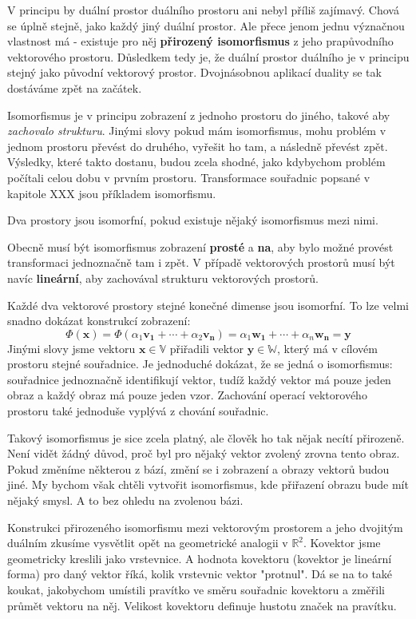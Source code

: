 \documentclass[a5paper,12pt]{amsbook}
\theoremstyle{definition}
\newcommand{\myvec}[1]{\mathbf{#1}}
\newcommand{\myspace}[1]{\mathbb{#1}}
\newcommand{\mymap}[1]{#1}
\begin{document}
V principu by duální prostor duálního prostoru ani nebyl příliš zajímavý. Chová se úplně stejně, jako
každý jiný duální prostor. Ale přece jenom jednu význačnou vlastnost má - existuje pro něj
\textbf{přirozený isomorfismus} z jeho prapůvodního vektorového prostoru. Důsledkem tedy je, že duální
prostor duálního je v principu stejný jako původní vektorový prostor. Dvojnásobnou aplikací duality
se tak dostáváme zpět na začátek.

Isomorfismus je v principu zobrazení z jednoho prostoru do jiného, takové aby \textit{zachovalo strukturu}.
Jinými slovy pokud mám isomorfismus, mohu problém v jednom prostoru převést do druhého, vyřešit ho tam,
a následně převést zpět. Výsledky, které takto dostanu, budou zcela shodné, jako kdybychom problém počítali
celou dobu v prvním prostoru. Transformace souřadnic popsané v kapitole XXX jsou příkladem isomorfismu.

Dva prostory jsou isomorfní, pokud existuje nějaký isomorfismus mezi nimi.

Obecně musí být isomorfismus zobrazení \textbf{prosté} a \textbf{na}, aby bylo možné provést transformaci
jednoznačně tam i zpět. V případě vektorových prostorů musí být navíc \textbf{lineární}, aby zachovával
strukturu vektorových prostorů.

\medskip\noindent
Každé dva vektorové prostory stejné konečné dimense jsou isomorfní. To lze velmi snadno dokázat konstrukcí
zobrazení:
\begin{equation*}
\mymap{\Phi(\myvec{x})} = \mymap{\Phi(\alpha_1\myvec{v_1} + \cdots + \alpha_2\myvec{v_n})} = \alpha_1\myvec{w_1}
 + \cdots + \alpha_n\myvec{w_n} = \myvec{y}
\end{equation*}
Jinými slovy jsme vektoru $\myvec{x} \in \myspace{V}$ přiřadili vektor $\myvec{y} \in \myspace{W}$, který má
v cílovém prostoru stejné souřadnice. Je jednoduché dokázat, že se jedná o isomorfismus: souřadnice jednoznačně
identifikují vektor, tudíž každý vektor má pouze jeden obraz a každý obraz má pouze jeden vzor. Zachování
operací vektorového prostoru také jednoduše vyplývá z chování souřadnic.

Takový isomorfismus je sice zcela platný, ale člověk ho tak nějak necítí přirozeně. Není vidět žádný důvod,
proč byl pro nějaký vektor zvolený zrovna tento obraz. Pokud změníme některou z bází, změní se i zobrazení
a obrazy vektorů budou jiné. My bychom však chtěli vytvořit isomorfismus, kde přiřazení obrazu bude mít
nějaký smysl. A to bez ohledu na zvolenou bázi.

\medskip\noindent
Konstrukci přirozeného isomorfismu mezi vektorovým prostorem a jeho dvojitým duálním zkusíme vysvětlit opět
na geometrické analogii v $\mathbb{R}^2$. Kovektor jsme geometricky kreslili jako vrstevnice. A hodnota kovektoru
(kovektor je lineární forma) pro daný vektor říká, kolik vrstevnic vektor "protnul". Dá se na to také koukat,
jakobychom umístili pravítko ve směru souřadnic kovektoru a změřili průmět vektoru na něj. Velikost
kovektoru definuje hustotu značek na pravítku.
\end{document}
